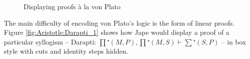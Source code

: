 \begin{figure}
{\label{fig:Aristotle:Darapti_3}}
\caption{Displaying proofs \`a la von Plato}
\label{fig:Aristotle:Darapti_various}
\end{figure}
%
%
%
%
The main difficulty of encoding von Plato's logic is the form of linear proofs. Figure \ref{fig:Aristotle:Darapti_1} shows how Jape would display a proof of a particular syllogism  -- Darapti: $∏⁺(M,P), ∏⁺(M,S) ⊢ ∑⁺(S,P)$ -- in box style with cuts and identity steps hidden. 

